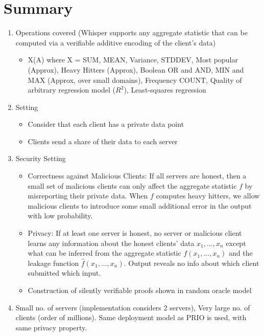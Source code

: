 \section{Summary}
\begin{enumerate}
    \item Operations covered (Whisper supports any aggregate statistic that can be computed via a verifiable additive encoding of the client's data)
    \begin{itemize}
        \item X(A) where X = SUM, MEAN, Variance, STDDEV, Most popular (Approx), Heavy Hitters (Approx), Boolean OR and AND, MIN and MAX (Approx, over small domains), Frequency COUNT, Quality of arbitrary regression model ($R^2$), Least-squares regression
    \end{itemize}
    \item Setting
    \begin{itemize}
        \item Consider that each client has a private data point
        \item Clients send a share of their data to each server 
    \end{itemize}
    \item Security Setting
    \begin{itemize}
        \item Correctness against Malicious Clients: If all servers are honest, then a small set of malicious clients can only affect the aggregate statistic $f$ by misreporting their private data. When $f$ computes heavy hitters, we allow malicious clients to introduce some small additional error in the output with low probability. 
        \item Privacy: If at least one server is honest, no server or malicious client learns any information about the honest clients' data $x_1, ..., x_n$ except what can be inferred from the aggregate statistic $f(x_1, ..., x_n)$ and the leakage function $\hat{f}(x_1, ..., x_n)$. Output reveals no info about which client submitted which input.
        \item Construction of silently verifiable proofs shown in random oracle model
    \end{itemize}
    \item Small no. of servers (implementation considers 2 servers), Very large no. of clients (order of millions). Same deployment model as PRIO is used, with same privacy property.
\end{enumerate}

